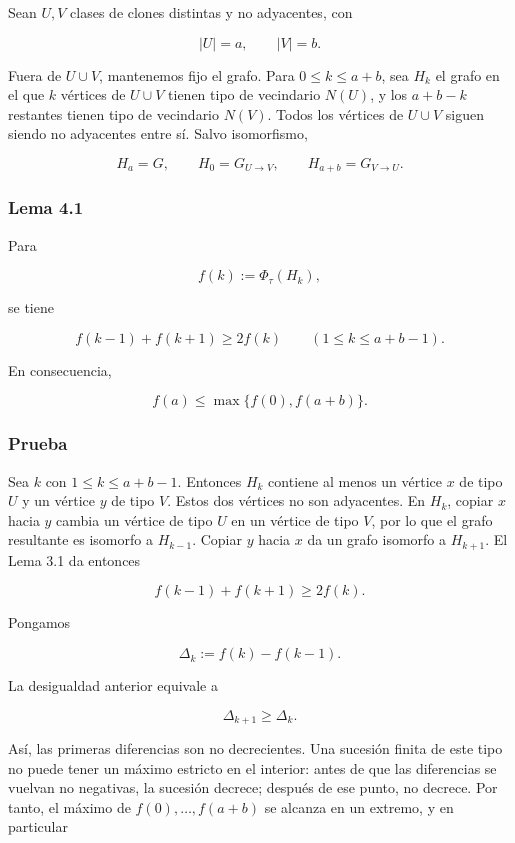 \documentclass[
  11pt,
]{article}
\begin{document}
Sean \(U,V\) clases de clones distintas y no adyacentes, con

\[
|U|=a,
\qquad
|V|=b.
\]

Fuera de \(U\cup V\), mantenemos fijo el grafo. Para \(0\le k\le a+b\),
sea \(H_k\) el grafo en el que \(k\) vértices de \(U\cup V\) tienen tipo
de vecindario \(N(U)\), y los \(a+b-k\) restantes tienen tipo de
vecindario \(N(V)\). Todos los vértices de \(U\cup V\) siguen siendo no
adyacentes entre sí. Salvo isomorfismo,

\[
H_a=G,
\qquad
H_0=G_{U\to V},
\qquad
H_{a+b}=G_{V\to U}.
\]

\subsubsection{Lema 4.1}\label{lema-4.1}

Para

\[
f(k):=\Phi_\tau(H_k),
\]

se tiene

\[
f(k-1)+f(k+1)\ge2f(k)
\qquad
(1\le k\le a+b-1).
\]

En consecuencia,

\[
f(a)\le\max\{f(0),f(a+b)\}.
\]

\subsubsection{Prueba}\label{prueba-2}

Sea \(k\) con \(1\le k\le a+b-1\). Entonces \(H_k\) contiene al menos un
vértice \(x\) de tipo \(U\) y un vértice \(y\) de tipo \(V\). Estos dos
vértices no son adyacentes. En \(H_k\), copiar \(x\) hacia \(y\) cambia
un vértice de tipo \(U\) en un vértice de tipo \(V\), por lo que el
grafo resultante es isomorfo a \(H_{k-1}\). Copiar \(y\) hacia \(x\) da
un grafo isomorfo a \(H_{k+1}\). El Lema 3.1 da entonces

\[
f(k-1)+f(k+1)\ge2f(k).
\]

Pongamos

\[
\Delta_k:=f(k)-f(k-1).
\]

La desigualdad anterior equivale a

\[
\Delta_{k+1}\ge\Delta_k.
\]

Así, las primeras diferencias son no decrecientes. Una sucesión finita
de este tipo no puede tener un máximo estricto en el interior: antes de
que las diferencias se vuelvan no negativas, la sucesión decrece;
después de ese punto, no decrece. Por tanto, el máximo de
\(f(0),\ldots,f(a+b)\) se alcanza en un extremo, y en particular
\end{document}
